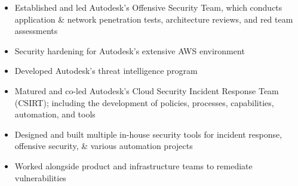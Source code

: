 \documentclass[10pt,a4paper]{altacv}
\begin{document}

\begin{fullwidth}
\makecvheader
\end{fullwidth}


\begin{itemize}
\item Established and led Autodesk's Offensive Security Team, which conducts application \& network penetration tests, architecture reviews, and red team assessments
\item Security hardening for Autodesk's extensive AWS environment
\item Developed Autodesk's threat intelligence program
\end{itemize}

\divider

\begin{itemize}
\item Matured and co-led Autodesk's Cloud Security Incident Response Team (CSIRT); including the development of policies, processes, capabilities, automation, and tools
\item Designed and built multiple in-house security tools for incident response, offensive security, \& various automation projects
\item Worked alongside product and infrastructure teams to remediate vulnerabilities
\end{itemize}
\end{document}
